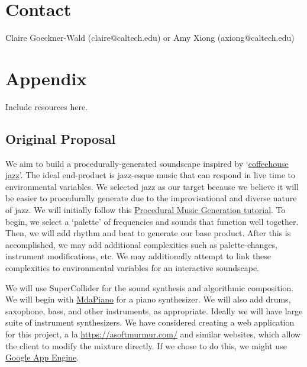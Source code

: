 \documentclass[12pt,a4paper]{article}
\begin{document}

\section{Contact}

Claire Goeckner-Wald (claire@caltech.edu) or Amy Xiong (axiong@caltech.edu)


\section{Appendix}
Include resources here.

\subsection{Original Proposal}
We aim to build a procedurally-generated soundscape inspired by `\href{https://www.youtube.com/watch?v=K2Q6YO3Ez44}{coffeehouse jazz}'. The ideal end-product is jazz-esque music that can respond in live time to environmental variables. We selected jazz as our target because we believe it will be easier to procedurally generate due to the improvisational and diverse nature of jazz. We will initially follow this \href{http://www.procjam.com/tutorials/en/music/}{Procedural Music Generation tutorial}. To begin, we select a `palette' of frequencies and sounds that function well together. Then, we will add rhythm and beat to generate our base product. After this is accomplished, we may add additional complexities such as palette-changes, instrument modifications, etc. We may additionally attempt to link these complexities to environmental variables for an interactive soundscape.

We will use SuperCollider for the sound synthesis and algorithmic composition. We will begin with \href{http://doc.sccode.org/Classes/MdaPiano.html}{MdaPiano} for a piano synthesizer. We will also add drums, saxophone, bass, and other instruments, as appropriate. Ideally we will have large suite of instrument synthesizers. We have considered creating a web application for this project, a la \href{Soft Murmur}{https://asoftmurmur.com/} and similar websites, which allow the client to modify the mixture directly. If we chose to do this, we might use \href{https://console.cloud.google.com/projectselector/appengine}{Google App Engine}. 
\end{document}

